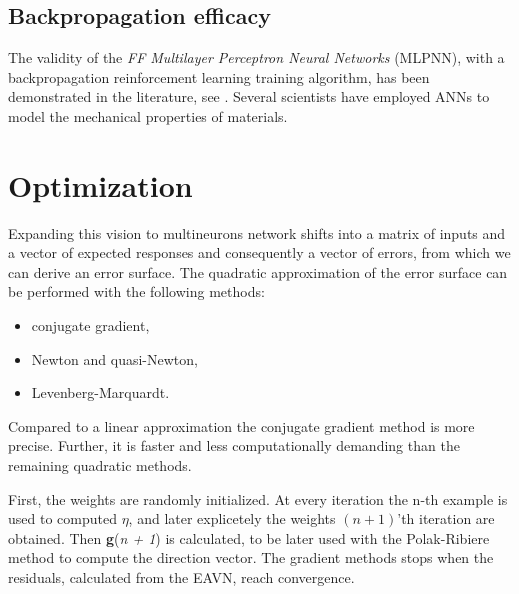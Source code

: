 \subsection{Backpropagation efficacy}
\label{subsec:backpropagationefficacy}

The validity of the \textit{\acs{FF} Multilayer Perceptron Neural Networks}
(\acs{MLPNN}), with a backpropagation reinforcement learning training algorithm,
has been demonstrated in the 
literature, see \citet{RefWorks:158}. Several scientists 
\cite{RefWorks:161, RefWorks:166, RefWorks:167, RefWorks:168, RefWorks:169,
RefWorks:170, RefWorks:178, RefWorks:179} have employed \acs{ANNs} to model
the mechanical properties of materials.

\section{Optimization}
\label{sec:optimization}

Expanding this vision to multineurons network shifts into a matrix of inputs and
a vector of expected responses and consequently a vector of errors, from which
we can derive an error surface. 
The quadratic approximation of the error surface can be performed with the
following methods:

\begin{itemize}
  \item{conjugate gradient,}
  \item{Newton and quasi-Newton,}
  \item{Levenberg-Marquardt.}
\end{itemize}

Compared to a linear approximation the conjugate gradient method is 
more precise. 
Further, it is faster and less computationally demanding than the
remaining quadratic methods.



First, the weights are randomly initialized. 
At every iteration the n-th example is used to computed $\eta$, and later
explicetely the weights $(n + 1)$'th iteration are obtained.
Then \textbf{g}(\textit{n + 1}) is calculated, to be later used with the
Polak-Ribiere method to compute the direction vector.
The gradient methods stops when the residuals, calculated from the
\acs{EAVN}, reach convergence.


